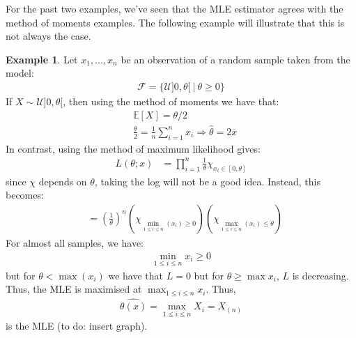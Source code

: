 \documentclass[11pt]{scrartcl}
\theoremstyle{definition}
\newtheorem{ex}{Example}
\theoremstyle{remark}
\newcommand{\dist}[0]{\mathcal{F}}
\newcommand{\smean}[0]{\frac{1}{n} \sum_{i=1}^n x_i}
\newcommand{\EX}[1]{\mathbb{E}\left[#1 \right]}
\begin{document}
{For the past two examples, we've seen that the MLE estimator agrees with the method of moments examples. The following example will illustrate that this is not always the case. 
\begin{ex} 
	Let $x_1, ..., x_n$ be an observation of a random sample taken from the model: 
	\begin{align*}
		\dist = \{ \mathcal{U}]0, \theta [\ |\ \theta \geq 0 \} 	
	\end{align*}
	If $X \sim \mathcal{U}]0, \theta[$, then using the method of moments we have that: 
	\begin{align*}
		& \EX{X} = \theta/2 \\
		& \frac{\theta}{2} = \smean \Rightarrow \hat{\theta} = 2 \overline{x}
	\end{align*}
	In contrast, using the method of maximum likelihood gives: 
	\begin{align*}
		L(\theta; x ) & = \prod_{i=1}^n \frac{1}{\theta} \chi_{x_i \in [0, \theta] } 	
	\end{align*}
	since $\chi$ depends on $\theta$, taking the log will not be a good idea. Instead, this becomes: 
	\begin{align*}
			& = \left( \frac{1}{\theta} \right)^n ( \chi_{\min_{1 \leq i \leq n} (x_i) \geq 0} )( \chi_{\max_{1 \leq i \leq n} (x_i) \leq \theta} )
	\end{align*}
	For almost all samples, we have: 
	\begin{align*}
		\min_{1 \leq i \leq n} x_i \geq 0	
	\end{align*}
	but for $\theta < \max (x_i)$ we have that $L=0$ but for $\theta \geq \max x_i$, $L$ is decreasing. Thus, the MLE is maximised at $\max_{1 \leq i \leq n} x_i$. Thus, 
	\begin{align*}	
		\hat{\theta(x)} = \max_{1 \leq i \leq n} X_i = X_{(n)}	
	\end{align*}
	is the MLE (to do: insert graph). 
\end{ex}

}
\end{document}
